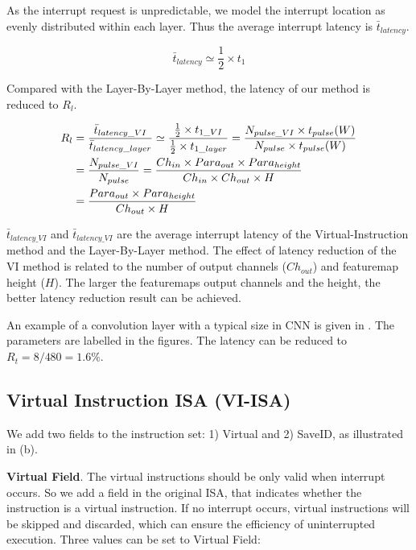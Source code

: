 As the interrupt request is unpredictable, we model the interrupt location as evenly distributed within each layer. Thus the average interrupt latency is $\bar{t}_{latency} $.

\begin{equation}
	\bar{t}_{latency}  \simeq \frac{1}{2} \times t_{1}
\end{equation}

Compared with the Layer-By-Layer method, the latency of our method is reduced to $R_l$.

\begin{equation}
	\small
	\begin{split}
	R_l & =  \frac{\bar{t}_{latency\_VI}}{\bar{t}_{latency\_layer}} \simeq \frac{\frac{1}{2} \times t_{1\_VI}}{\frac{1}{2} \times t_{1\_layer}}  = \frac{ N_{pulse\_VI} \times t_{pulse}(W) }{ N_{pulse} \times t_{pulse}(W) }  \\
		   & = \frac{ N_{pulse\_VI} }{N_{pulse} } = \frac{ Ch_{in} \times Para_{out} \times Para_{height}  }{  Ch_{in} \times Ch_{out} \times H } \\
		   & = \frac{ Para_{out} \times Para_{height} }{ Ch_{out} \times H} 
	\end{split}
\end{equation}

$\bar{t}_{latency\_VI}$ and $\bar{t}_{latency\_VI}$ are the average interrupt latency of the Virtual-Instruction method and the Layer-By-Layer method. The effect of latency reduction of the VI method is related to the number of output channels ($Ch_{out}$) and featuremap height ($H$). The larger the featuremaps output channels and the height, the better latency reduction result can be achieved.

An example of a convolution layer with a typical size in CNN is given in . The parameters are labelled in the figures. The latency can be reduced to $R_t = 8/480 =1.6\%$.



\subsection{Virtual Instruction ISA (VI-ISA) }
\label{sec:virtualinstr}

We add two fields to the instruction set: 1) Virtual and 2) SaveID, as illustrated in (b). 

\textbf{   Virtual Field}. The virtual instructions should be only valid when interrupt occurs. So we add a field in the original ISA, that indicates whether the instruction is a virtual instruction. If no interrupt occurs, virtual instructions will be skipped and discarded, which can ensure the efficiency of uninterrupted execution. Three values can be set to Virtual Field:

